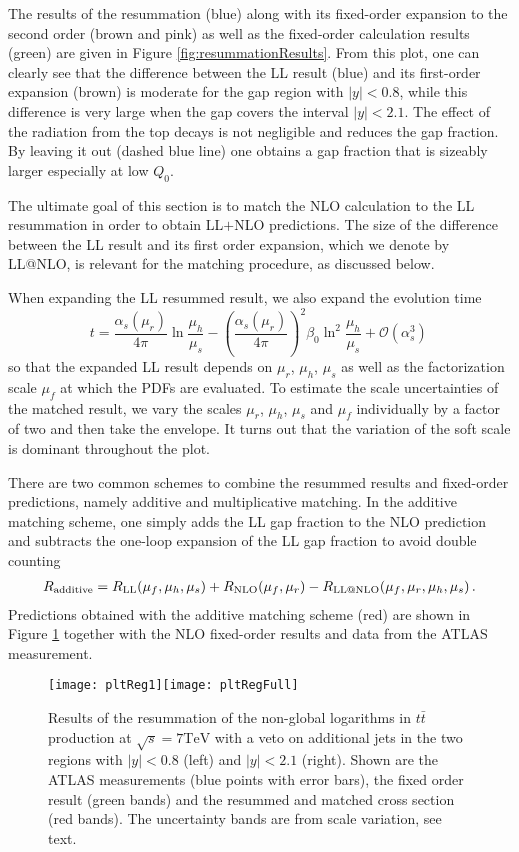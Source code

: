 \documentclass[11pt,a4paper]{article}
\begin{document}
The results of the resummation (blue) along with its fixed-order expansion to the second order (brown and pink) as well as the fixed-order calculation results (green) are given in Figure \ref{fig:resummationResults}. From this plot, one can clearly see that the difference between the LL result (blue) and its first-order expansion (brown) is moderate for the gap region with  $|y|<0.8$, while this difference is very large when the gap covers the interval $|y|<2.1$. The effect of the radiation from the top decays is not negligible and reduces the gap fraction. By leaving it out (dashed blue line) one obtains a gap fraction that is sizeably larger especially at low $Q_0$.

The ultimate goal of this section is to match the NLO calculation to the LL resummation in order to obtain LL$+$NLO predictions.
The size of the difference between the LL result and its first order expansion, which we denote by LL@NLO, is relevant for the matching procedure, as discussed below. 

When expanding the LL resummed result, we also expand the evolution time
\begin{equation}
t = \frac{\alpha_s(\mu_r)}{4\pi} \ln \frac{\mu_h}{\mu_s} -\left(\frac{\alpha_s(\mu_r)}{4 \pi}  \right)^2\beta_0 \ln ^2\frac{\mu_h}{\mu_s} +\mathcal{O}(\alpha_s^3)\, 
\end{equation}
so that the expanded LL result depends on $\mu_r$, $\mu_h$, $\mu_s$ as well as the factorization scale $\mu_f$ at which the PDFs are evaluated. To estimate the scale uncertainties of the matched result, we vary the scales $\mu_r$, $\mu_h$, $\mu_s$ and $\mu_f$ individually by a factor of two and then take the envelope.  It turns out that the variation of the soft scale is dominant throughout the plot.

There are two common schemes to combine the resummed results and fixed-order predictions, namely  additive and  multiplicative matching. In the additive matching scheme, one simply adds the LL gap fraction to the NLO prediction and subtracts the one-loop expansion of the LL gap fraction to avoid double counting
\begin{align}\label{eq:matching}
	R_{\text{additive}}=R_{\rm LL}(\mu_f,\mu_h,\mu_s)+R_{\rm NLO}(\mu_f,\mu_r)-R_{\rm LL @ NLO}(\mu_f,\mu_r,\mu_h,\mu_s)\, .
\end{align} 
Predictions obtained with the additive matching scheme (red) are shown in Figure \ref{fig:matchedResults} together with the NLO fixed-order results and data from the ATLAS measurement.
\begin{figure}[t]
	\centering
	\texttt{[image: pltReg1]}\texttt{[image: pltRegFull]}	\caption{Results of the resummation of the non-global logarithms in $t\bar{t}$ production at $\sqrt{s} = 7 \text{TeV}$ with a veto on additional jets in the two regions with $|y| < 0.8$ (left) and $|y| < 2.1$ (right). Shown are the ATLAS measurements (blue points with error bars), the fixed order result (green bands) and the resummed and matched cross section (red bands). The uncertainty bands are from scale variation, see text.\label{fig:matchedResults}}
\end{figure}
	
\end{document}
